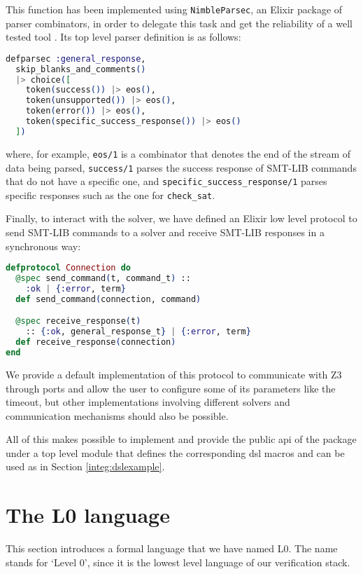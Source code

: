 This function has been implemented using \verb|NimbleParsec|, an Elixir package
of parser combinators, in order to delegate this task and get the reliability of
a well tested tool \citep{NimbleDocs}. Its top level parser definition is as
follows:

\begin{lstlisting}[language=elixir,numbers=none,frame=none]
defparsec :general_response,
  skip_blanks_and_comments()
  |> choice([
    token(success()) |> eos(),
    token(unsupported()) |> eos(),
    token(error()) |> eos(),
    token(specific_success_response()) |> eos()
  ])
\end{lstlisting}

where, for example, \verb|eos/1| is a combinator that denotes the end of the 
stream of data being parsed, \verb|success/1| parses the success response of
SMT-LIB commands that do not have a specific one, and
\verb|specific_success_response/1| parses specific responses such as the one for
\verb|check_sat|.

Finally, to interact with the solver, we have defined an Elixir low level
protocol to send SMT-LIB commands to a solver and receive SMT-LIB responses in a
synchronous way:

\begin{lstlisting}[language=elixir,numbers=none,frame=none]
defprotocol Connection do
  @spec send_command(t, command_t) :: 
    :ok | {:error, term}
  def send_command(connection, command)

  @spec receive_response(t) 
    :: {:ok, general_response_t} | {:error, term}
  def receive_response(connection)
end
\end{lstlisting}

We provide a default implementation of this protocol to communicate with Z3
through ports and allow the user to configure some of its parameters like the
timeout, but other implementations involving different solvers and communication
mechanisms should also be possible.

All of this makes possible to implement and provide the public \gls{api} of the 
package under a top level module that defines the corresponding \gls{dsl} macros
and can be used as in Section \ref{integ:dslexample}.

\section{The L0 language}

This section introduces a formal language that we have named L0. The name stands
for `Level 0', since it is the lowest level language of our verification stack.

